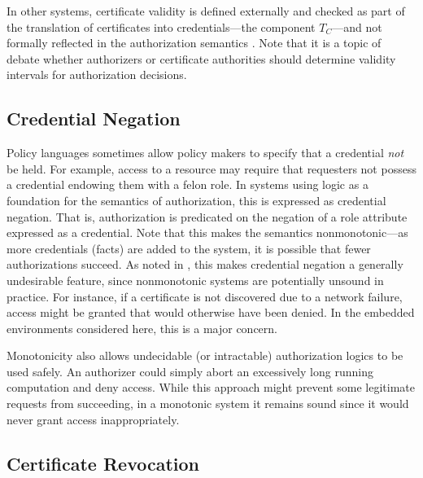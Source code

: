 In other systems, certificate validity is defined externally and checked as part of the
translation of certificates into credentials---the component $T_C$---and not formally reflected
in the authorization semantics \cite{RFC-2693}. Note that it is a topic of debate whether
authorizers \cite{Rivest:CWECRL} or certificate authorities \cite{McDaniel:RTCWECRL} should
determine validity intervals for authorization decisions.

\subsection{Credential Negation}

Policy languages sometimes allow policy makers to specify that a credential \emph{not} be held.
For example, access to a resource may require that requesters not possess a credential endowing
them with a felon role. In systems using logic as a foundation for the semantics of
authorization, this is expressed as credential negation. That is, authorization is predicated on
the negation of a role attribute expressed as a credential. Note that this makes the semantics
nonmonotonic---as more credentials (facts) are added to the system, it is possible that fewer
authorizations succeed. As noted in \cite{seamons-policy02}, this makes credential negation a
generally undesirable feature, since nonmonotonic systems are potentially unsound in practice.
For instance, if a certificate is not discovered due to a network failure, access might be
granted that would otherwise have been denied. In the embedded environments considered here,
this is a major concern.

Monotonicity also allows undecidable (or intractable) authorization logics to be used safely. An
authorizer could simply abort an excessively long running computation and deny access. While
this approach might prevent some legitimate requests from succeeding, in a monotonic system it
remains sound since it would never grant access inappropriately.

\subsection{Certificate Revocation}

